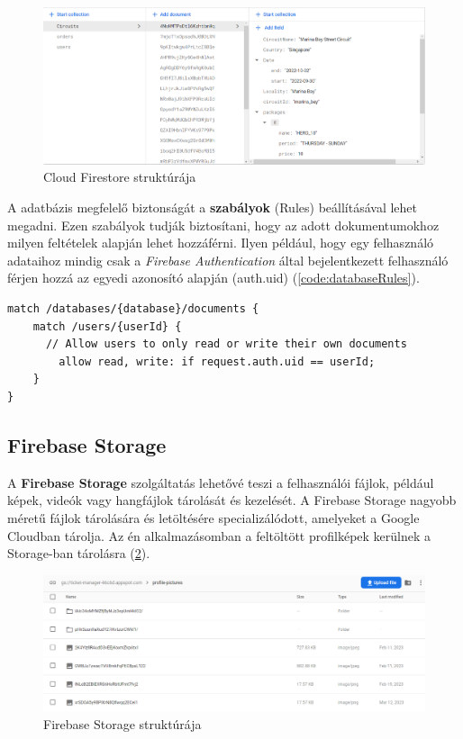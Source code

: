 \begin{figure}[!h]
	\centering
	\includegraphics[scale=0.4]{images/firestoreStructure}
	\caption{Cloud Firestore struktúrája}
	\label{abra:firestoreStructure}
\end{figure}

A adatbázis megfelelő biztonságát a \textbf{szabályok} (Rules) beállításával lehet megadni. Ezen szabályok tudják biztosítani, hogy az adott dokumentumokhoz milyen feltételek alapján lehet hozzáférni. Ilyen például, hogy egy felhasználó adataihoz mindig csak a \textit{Firebase Authentication} által bejelentkezett felhasználó férjen hozzá az egyedi azonosító alapján (auth.uid) (\ref{code:databaseRules}).

\begin{lstlisting}[caption={Firestore szabályok.}, captionpos=b, label={code:databaseRules}]
match /databases/{database}/documents {
    match /users/{userId} {
      // Allow users to only read or write their own documents
    	allow read, write: if request.auth.uid == userId;
    }
}
\end{lstlisting}

\subsection {Firebase Storage}

A \textbf{Firebase Storage} szolgáltatás lehetővé teszi a felhasználói fájlok, például képek, videók vagy hangfájlok tárolását és kezelését. A Firebase Storage nagyobb méretű fájlok tárolására és letöltésére specializálódott, amelyeket a Google Cloudban tárolja. Az én alkalmazásomban a feltöltött profilképek kerülnek a Storage-ban tárolásra (\ref{abra:storageStructure}).

\begin{figure}[!h]
	\centering
	\includegraphics[scale=0.4]{images/storageStructure}
	\caption{Firebase Storage struktúrája}
	\label{abra:storageStructure}
\end{figure}
\pagebreak

